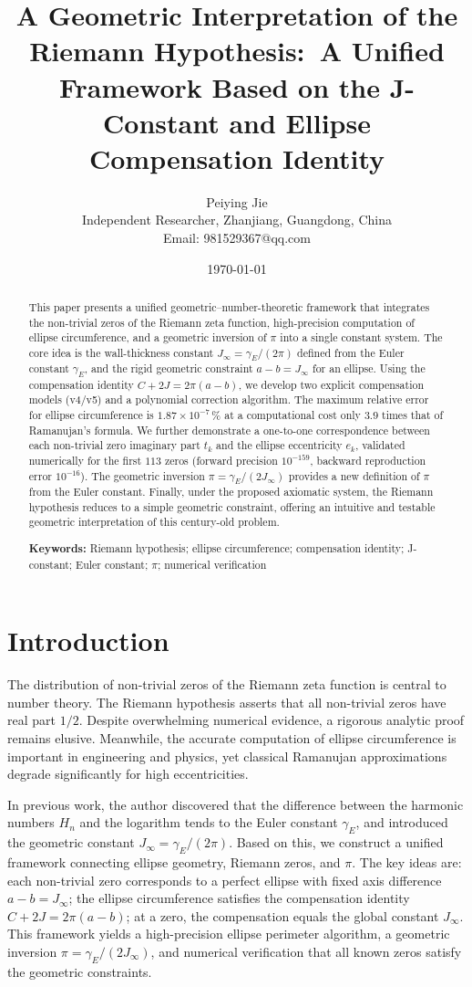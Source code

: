 \documentclass[12pt,a4paper]{article}
\title{A Geometric Interpretation of the Riemann Hypothesis:\
A Unified Framework Based on the J-Constant and Ellipse Compensation Identity}
\author{Peiying Jie\\
\small Independent Researcher, Zhanjiang, Guangdong, China\\
\small Email: 981529367@qq.com}
\date{\today}
\begin{document}
\maketitle

\begin{abstract}
This paper presents a unified geometric--number-theoretic framework that integrates the non-trivial zeros of the Riemann zeta function, high-precision computation of ellipse circumference, and a geometric inversion of $\pi$ into a single constant system. The core idea is the wall-thickness constant $J_\infty = \gamma_E/(2\pi)$ defined from the Euler constant $\gamma_E$, and the rigid geometric constraint $a-b = J_\infty$ for an ellipse. Using the compensation identity $C + 2J = 2\pi(a-b)$, we develop two explicit compensation models (v4/v5) and a polynomial correction algorithm. The maximum relative error for ellipse circumference is $1.87\times10^{-7}\,\%$ at a computational cost only $3.9$ times that of Ramanujan's formula. We further demonstrate a one-to-one correspondence between each non-trivial zero imaginary part $t_k$ and the ellipse eccentricity $e_k$, validated numerically for the first $113$ zeros (forward precision $10^{-159}$, backward reproduction error $10^{-16}$). The geometric inversion $\pi = \gamma_E/(2J_\infty)$ provides a new definition of $\pi$ from the Euler constant. Finally, under the proposed axiomatic system, the Riemann hypothesis reduces to a simple geometric constraint, offering an intuitive and testable geometric interpretation of this century-old problem.

\medskip
\noindent\textbf{Keywords:} Riemann hypothesis; ellipse circumference; compensation identity; J-constant; Euler constant; $\pi$; numerical verification
\end{abstract}

\section{Introduction}\label{sec:intro}
The distribution of non-trivial zeros of the Riemann zeta function is central to number theory. The Riemann hypothesis asserts that all non-trivial zeros have real part $1/2$. Despite overwhelming numerical evidence, a rigorous analytic proof remains elusive. Meanwhile, the accurate computation of ellipse circumference is important in engineering and physics, yet classical Ramanujan approximations degrade significantly for high eccentricities.

In previous work, the author discovered that the difference between the harmonic numbers $H_n$ and the logarithm tends to the Euler constant $\gamma_E$, and introduced the geometric constant $J_\infty = \gamma_E/(2\pi)$. Based on this, we construct a unified framework connecting ellipse geometry, Riemann zeros, and $\pi$. The key ideas are: each non-trivial zero corresponds to a perfect ellipse with fixed axis difference $a-b = J_\infty$; the ellipse circumference satisfies the compensation identity $C+2J = 2\pi(a-b)$; at a zero, the compensation equals the global constant $J_\infty$. This framework yields a high-precision ellipse perimeter algorithm, a geometric inversion $\pi = \gamma_E/(2J_\infty)$, and numerical verification that all known zeros satisfy the geometric constraints.
\end{document}
